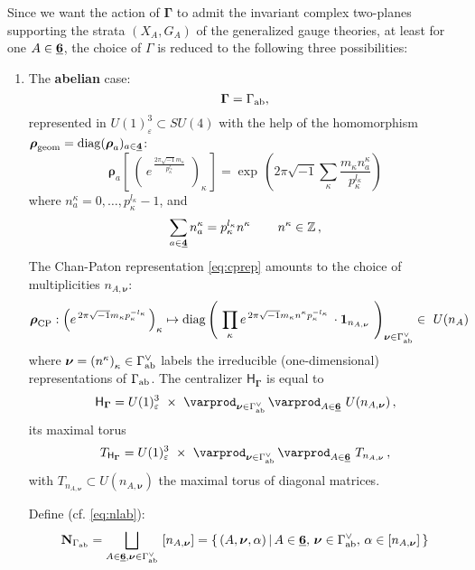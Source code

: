 \documentclass[12pt]{amsart}
\newcommand {\3}{\underline{\bf 3}}
\newcommand {\4}{\underline{\bf 4}}
\newcommand {\6}{\underline{\bf 6}}
\newcommand{\beq}{\begin{equation}}
\newcommand{\eeq}{\end{equation}}
\newcommand {\bN}   {\mathbf{N}}
\newcommand {\Hf} {\mathsf{H}}
\newcommand {\bnu} {{\boldsymbol{\nu}}}
\newcommand {\bro} {{\boldsymbol{\rho}}}
\newcommand {\BZ}   {\mathbb Z}
\newcommand{\ve}{\varepsilon}
\newcommand{\Gammadi}{\boldsymbol{\Gamma}}
\newcommand{\Gamab}{{\Gamma}_{\rm ab}}
\newcommand{\Gamav}{{\Gamma}^{\vee}_{\rm ab}}
\begin{document}
Since we want the action of $\Gammadi$ to admit the invariant complex two-planes  supporting the strata $(X_{A}, G_{A})$ of the generalized gauge theories, at least for one $A \in {\6}$, the choice of $\Gamma$ is reduced to the following three possibilities:
\begin{enumerate}

\item The {\bf abelian} case:
\beq
{\Gammadi} = {\Gamab}, \eeq
represented in $U(1)_{\ve}^{3} \subset SU(4)$ with the help of the homomorphism ${\bro}_{\rm geom} = {\rm diag} ({\bro}_{a} )_{a\in \4}$:
\beq
{\bro}_{a} \left[ \ \left( \ e^{ \, \frac{2\pi \sqrt{-1}m_{\kappa}}{p_{\kappa}^{l_{\kappa}}} \, } \ \right)_{\kappa} \, \right] = {\exp}\, \left( 2\pi\sqrt{-1} \sum_{\kappa} \frac{m_{\kappa} n^{\kappa}_{a}}{p_{\kappa}^{l_{\kappa}}} \right)
\label{eq:rhoa}
\eeq
where $n^{\kappa}_{a} = 0, \ldots , p_{\kappa}^{l_{\kappa}}-1$, and
\beq
\sum_{a \in \4} n_{a}^{\kappa} = p_{\kappa}^{l_{\kappa}} n^{\kappa}\, \qquad n^{\kappa} \in {\BZ}\, , \label{eq:nak}
\eeq
The Chan-Paton representation \eqref{eq:cprep} amounts to the choice  of multiplicities $n_{A, \bnu}$:
\beq
{\bro}_{\rm CP}: \left(  e^{ \,  2\pi \sqrt{-1}m_{\kappa}p_{\kappa}^{-l_{\kappa}} \, } \right)_{\kappa} \mapsto 
{\rm diag} \left( \ \prod_{\kappa} e^{\,  2\pi \sqrt{-1} m_{\kappa}
 n^{\kappa}p_{\kappa}^{-l_{\kappa}}} \,  \cdot {\bf 1}_{n_{A, \bnu}} \ \right)_{{\bnu} \in {\Gamav}} \in\ U(n_{A})
 \eeq
 where ${\bnu} = \left( n^{\kappa} \right)_{\kappa} \in {\Gamav}$ labels the irreducible (one-dimensional) representations of $\Gamab$. 
The centralizer ${\Hf}_{\Gammadi}$ is equal to
\beq
{\Hf}_{\Gammadi} = U(1)^{3}_{\ve} \ \times \ \varprod_{{\bnu} \in {\Gamav}} \, \varprod_{A \in {\6}}   \ U(n_{A, {\bnu}}) \, , 
\eeq
its maximal torus
\beq
T_{{\Hf}_{\Gammadi}} = U(1)^{3}_{\ve} \ \times \ \varprod_{{\bnu} \in {\Gamav}} \, \varprod_{A \in {\6}}   \ T_{n_{A, {\bnu}}} \, , 
\eeq
with $T_{n_{A,{\bnu}}} \subset U(n_{A,{\bnu}})$ the maximal torus of diagonal matrices. 

Define (cf. \eqref{eq:nlab}):
\beq
{\bN}_{\Gamab} = \bigsqcup_{A\in {\6}, {\bnu} \in {\Gamav}}\ [n_{A, {\bnu}}] = \{ \, (A, {\bnu}, {\alpha}) \, | \, A \in {\6}, \, {\bnu} \in {\Gamav}, \, {\alpha} \in [n_{A, {\bnu}}] \, \}
\label{eq:nlabab}
\eeq

\bigskip


\end{enumerate}
\end{document}
